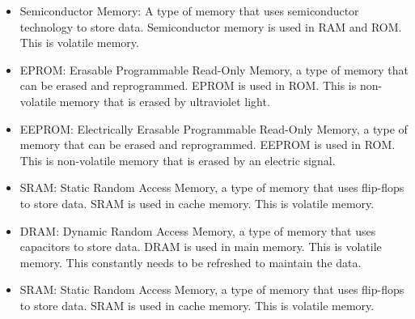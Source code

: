 \documentclass[12pt]{article}
\begin{document}
\begin{itemize}
	\item Semiconductor Memory: A type of memory that uses
	      semiconductor technology to store data. Semiconductor memory
	      is used in RAM and ROM. This is volatile memory.
      \item EPROM: Erasable Programmable Read-Only Memory, a type of
	      memory that can be erased and reprogrammed. EPROM is used
	      in ROM. This is non-volatile memory that is erased by
	      ultraviolet light.
      \item EEPROM: Electrically Erasable Programmable Read-Only
	      Memory, a type of memory that can be erased and reprogrammed.
	      EEPROM is used in ROM. This is non-volatile memory that is
	      erased by an electric signal.
      \item SRAM: Static Random Access Memory, a type of memory that
	      uses flip-flops to store data. SRAM is used in cache memory.
	      This is volatile memory.
      \item DRAM: Dynamic Random Access Memory, a type of memory that
	      uses capacitors to store data. DRAM is used in main memory.
	      This is volatile memory. This constantly needs to be refreshed
	      to maintain the data.
      \item SRAM: Static Random Access Memory, a type of memory that
	      uses flip-flops to store data. SRAM is used in cache memory.
	      This is volatile memory.
      \end{itemize}
\end{document}
